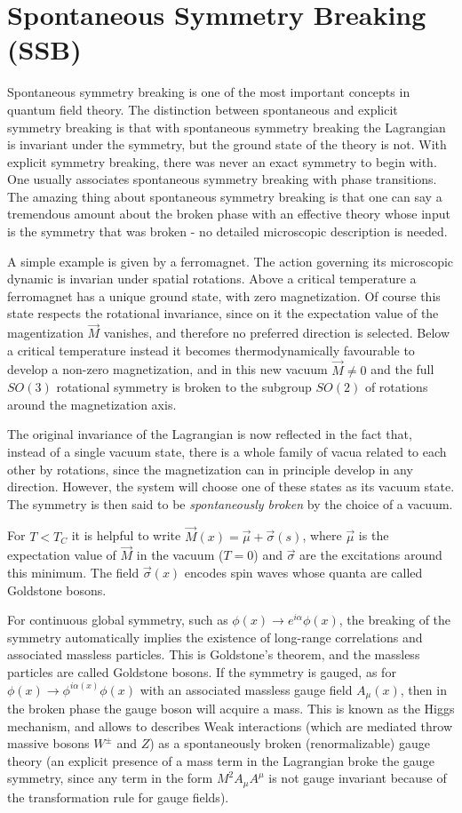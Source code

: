 \documentclass[TheoreticalPhy_ModB.tex]{subfiles}
\begin{document}
\chapter{Spontaneous Symmetry Breaking (SSB)}

Spontaneous symmetry breaking is one of the most important concepts in quantum field theory. The distinction between spontaneous and explicit symmetry breaking is that with spontaneous symmetry breaking the Lagrangian is invariant under the symmetry, but the ground state of the theory is not. With explicit symmetry breaking, there was never an exact symmetry to begin with. One usually associates spontaneous symmetry breaking with phase transitions. The amazing thing about spontaneous symmetry breaking is that one can say a tremendous amount about the broken phase with an effective theory whose input is the symmetry that was broken - no detailed microscopic description is needed. 

A simple example is given by a ferromagnet. The action governing its microscopic dynamic is invarian under spatial rotations. Above a critical temperature a ferromagnet has a unique ground state, with zero magnetization. Of course this state respects the rotational invariance, since on it the expectation value of the magentization $\vec M$ vanishes, and therefore no preferred direction is selected. Below a critical temperature instead it becomes thermodynamically favourable to develop a non-zero magnetization, and in this new vacuum $\vec M\neq0$ and the full $SO(3)$ rotational symmetry is broken to the subgroup $SO(2)$ of rotations around the magnetization axis. 

The original invariance of the Lagrangian is now reflected in the fact that, instead of a single vacuum state, there is a whole family of vacua related to each other by rotations, since the magnetization can in principle develop in any direction. However, the system will choose one of these states as its vacuum state. The symmetry is then said to be \emph{spontaneously broken} by the choice of a vacuum.

For $T<T_C$ it is helpful to write $\vec M(x)=\vec\mu+\vec\sigma(s)$, where $\vec\mu$ is the expectation value of $\vec M$ in the vacuum ($T=0$) and $\vec\sigma$ are the excitations around this minimum. The field $\vec\sigma(x)$ encodes spin waves whose quanta are called Goldstone bosons. 

For continuous global symmetry, such as $\phi(x)\to e^{i\alpha}\phi(x)$, the breaking of the symmetry automatically implies the existence of long-range correlations and associated massless particles. This is Goldstone's theorem, and the massless particles are called Goldstone bosons. If the symmetry is gauged, as for $\phi(x)\to\phi^{i\alpha(x)}\phi(x)$ with an associated massless gauge field $A_\mu(x)$, then in the broken phase the gauge boson will acquire a mass. This is known as the Higgs mechanism, and allows to describes Weak interactions (which are mediated throw massive bosons $W^\pm$ and $Z$) as a spontaneously broken (renormalizable) gauge theory (an explicit presence of a mass term in the Lagrangian broke the gauge symmetry, since any term in the form $M^2A_\mu A^\mu$ is not gauge invariant because of the transformation rule for gauge fields). 
\end{document}
